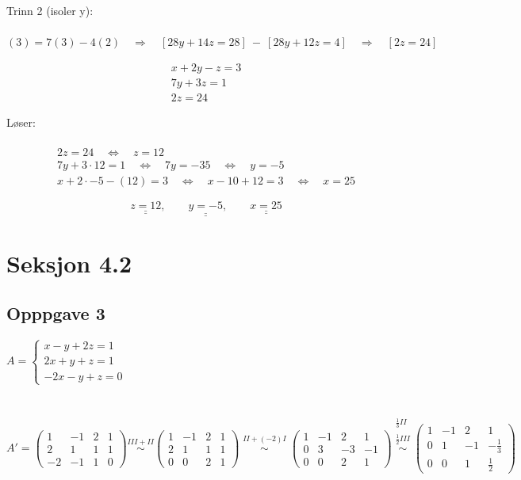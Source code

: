 \documentclass{article}
\newcommand{\uu}[1]{\underline{\underline{#1}}}
\newcommand{\lra}{\quad\Longrightarrow\quad}
\newcommand{\eq}{\quad\Longleftrightarrow\quad}
\newcommand{\eqto}[1]{\overset{#1}{\sim}}
\newcommand{\eqqto}[1]{\overset{\substack{#1}}{\sim}}
\begin{document}
Trinn 2 (isoler y): \\ \\
$(3) = 7(3) - 4(2) \lra [28y+14z=28]\ -\ [28y+12z=4] \lra [2z=24]$

\setcounter{equation}{0}
\begin{align}
    x + 2y -z = 3 \\
    7y + 3z = 1 \\
    2z = 24
\end{align}

Løser: \\\\
\begin{align*}
    2z = 24 \eq z = 12 \\
    7y + 3\cdot12 = 1 \eq 7y = -35 \eq y = -5 \\
    x + 2\cdot-5 -(12) = 3 \eq x-10+12 = 3 \eq x = 25
\end{align*}

\[\uu{z = 12}, \qquad \uu{y = -5}, \qquad \uu{x = 25}\]



\section*{Seksjon 4.2}

\subsection*{Opppgave 3}

\(A = \begin{cases}
    x-y+2z=1\\2x+y+z=1\\-2x-y+z=0
\end{cases}\)
\\ \\ \\
\(A' = \begin{pmatrix}
    1&-1&2&1\\2&1&1&1\\-2&-1&1&0
\end{pmatrix}
\eqto{III+II}
\begin{pmatrix}
    1&-1&2&1\\2&1&1&1\\0&0&2&1
\end{pmatrix}
\eqqto{II+(-2)I}
\begin{pmatrix}
    1&-1&2&1\\0&3&-3&-1\\0&0&2&1
\end{pmatrix}
\eqqto{\frac{1}{3}II\\\\ \frac{1}{2}III}
\begin{pmatrix}
    1&-1&2&1\\0&1&-1&-\frac{1}{3}\\0&0&1&\frac{1}{2}
\end{pmatrix}
\) \\
\end{document}
